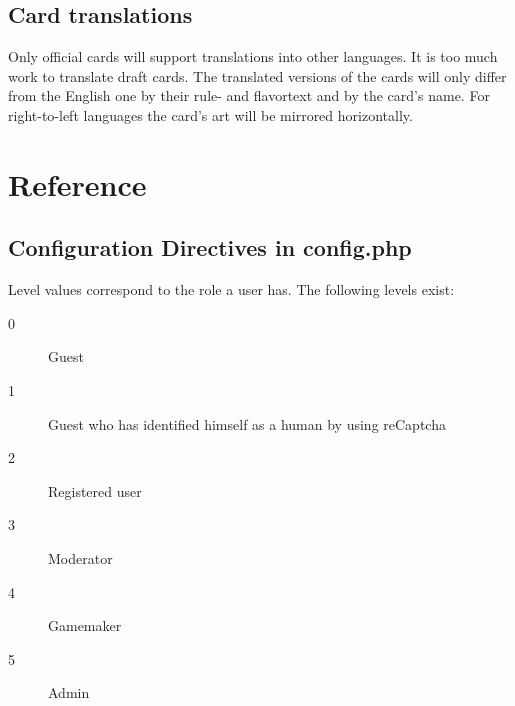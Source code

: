 \documentclass[a4paper, 11pt]{scrbook}
\begin{document}
\section{Card translations}
Only official cards will support translations into other languages. It is too much work to translate draft cards. The translated versions of the cards will only differ from the English one by their rule- and flavortext and by the card's name. For right-to-left languages the card's art will be mirrored horizontally.

\appendix
\chapter{Reference}
\section{Configuration Directives in config.php}\label{configExplain}
Level values correspond to the role a user has. The following levels exist:
\begin{description}
 \item[0] Guest
 \item[1] Guest who has identified himself as a human by using reCaptcha
 \item[2] Registered user
 \item[3] Moderator
 \item[4] Gamemaker
 \item[5] Admin
\end{description}

\newcommand{\boolval}[0]{(\texttt{true}\textbar \texttt{false})}
\end{document}
